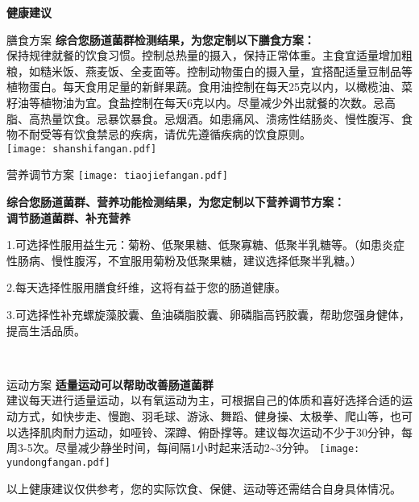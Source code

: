 

\usepackage{graphicx}
\graphicspath{{cores/}}



\vspace*{5mm}
\setlength{\arrayrulewidth}{1pt}
\fontsize{9.3pt}{11pt}\selectfont
\color{gray2}

\centerline{\bf\sanhao 健康建议}

\vspace*{2mm}

\begin{LRaside}[.20]{膳食方案}
{\bf *综合您肠道菌群检测结果，为您定制以下膳食方案：}\\
{\indent 保持规律就餐的饮食习惯。控制总热量的摄入，保持正常体重。主食宜适量增加粗粮，如糙米饭、燕麦饭、全麦面等。控制动物蛋白的摄入量，宜搭配适量豆制品等植物蛋白。每天食用足量的新鲜果蔬。食用油控制在每天25克以内，以橄榄油、菜籽油等植物油为宜。食盐控制在每天6克以内。尽量减少外出就餐的次数。忌高脂、高热量饮食。忌暴饮暴食。忌烟酒。如患痛风、溃疡性结肠炎、慢性腹泻、食物不耐受等有饮食禁忌的疾病，请优先遵循疾病的饮食原则。}\\
\asidebreak %
\noindent
\texttt{[image: shanshifangan.pdf]}

\end{LRaside}


\begin{LRaside}[.70]{营养调节方案}
\noindent
\texttt{[image: tiaojiefangan.pdf]}

\asidebreak %
{\bf *综合您肠道菌群、营养功能检测结果，为您定制以下营养调节方案：}\\
{\bf 调节肠道菌群、补充营养}\\{\indent 1.可选择性服用益生元：菊粉、低聚果糖、低聚寡糖、低聚半乳糖等。（如患炎症性肠病、慢性腹泻，不宜服用菊粉及低聚果糖，建议选择低聚半乳糖。）

2.每天选择性服用膳食纤维，这将有益于您的肠道健康。

3.可选择性补充螺旋藻胶囊、鱼油磷脂胶囊、卵磷脂高钙胶囊，帮助您强身健体，提高生活品质。}\\
\end{LRaside}

\begin{LRaside}[.20]{运动方案}
{\bf *适量运动可以帮助改善肠道菌群}\\
{\indent 建议每天进行适量运动，以有氧运动为主，可根据自己的体质和喜好选择合适的运动方式，如快步走、慢跑、羽毛球、游泳、舞蹈、健身操、太极拳、爬山等，也可以选择肌肉耐力运动，如哑铃、深蹲、俯卧撑等。建议每次运动不少于30分钟，每周3-5次。尽量减少静坐时间，每间隔1小时起来活动2\textasciitilde 3分钟。}
\asidebreak %
\noindent
\texttt{[image: yundongfangan.pdf]}

\end{LRaside}

{\noindent\qihao *以上健康建议仅供参考，您的实际饮食、保健、运动等还需结合自身具体情况。}


